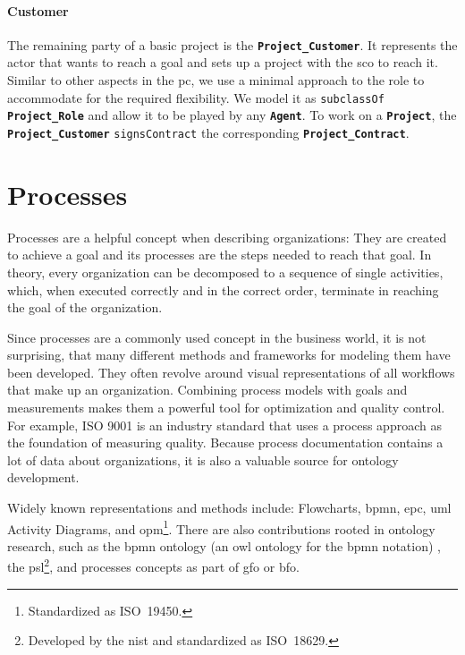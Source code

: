 \documentclass[a4paper, DIV=13, BCOR=0cm]{scrbook}
\newcommand{\class}[1]{\texttt{\textbf{#1}}}
\newcommand{\relation}[1]{\texttt{#1}}
\begin{document}
\paragraph{Customer}
The remaining party of a basic project is the \class{Project\_Customer}. It represents the actor that wants to reach a goal and sets up a project with the \gls{sco} to reach it. Similar to other aspects in the \gls{pc}, we use a minimal approach to the role to accommodate for the required flexibility. We model it as \relation{subclassOf} \class{Project\_Role} and allow it to be played by any \class{Agent}. To work on a \class{Project}, the \class{Project\_Customer} \relation{signsContract} the corresponding \class{Project\_Contract}.

\section{Processes }
\label{processes}
Processes are a helpful concept when describing organizations: They are created to achieve a goal and its processes are the steps needed to reach that goal. \cite[p.\,5, Definition 1.1]{Weske:2019aa} In theory, every organization can be decomposed to a sequence of single activities, which, when executed correctly and in the correct order, terminate in reaching the goal of the organization.

Since processes are a commonly used concept in the business world, it is not surprising, that many different methods and frameworks for modeling them have been developed. They often revolve around visual representations of all workflows that make up an organization. Combining process models with goals and measurements makes them a powerful tool for optimization and quality control. For example, ISO 9001 is an industry standard that uses a process approach as the foundation of measuring quality. \cite{iso-process-approach} Because process documentation contains a lot of data about organizations, it is also a valuable source for ontology development.

Widely known representations and methods include: Flowcharts, \gls{bpmn}, \gls{epc}, \gls{uml} Activity Diagrams, and \gls{opm}\footnote{Standardized as ISO~19450.}. There are also contributions rooted in ontology research, such as the \gls{bpmn} ontology (an \gls{owl} ontology for the \gls{bpmn} notation) \cite{2014foisbpmn}, the \gls{psl}\footnote{Developed by the \gls{nist} and standardized as ISO~18629.}, and processes concepts as part of \gls{gfo} or \gls{bfo}.
\end{document}
